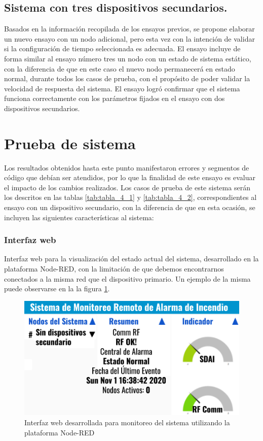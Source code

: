 \subsection{Sistema con tres dispositivos secundarios.}

Basados en la información recopilada de los ensayos previos, se propone elaborar un nuevo ensayo con un nodo adicional, pero esta vez con la intención de validar si la configuración de tiempo seleccionada es adecuada. El ensayo incluye de forma similar al ensayo número tres un nodo con un estado de sistema estático, con la diferencia de que en este caso el nuevo nodo permanecerá en estado normal, durante todos los casos de prueba, con el propósito de poder validar la velocidad de respuesta del sistema. El ensayo logró confirmar que el sistema funciona correctamente con los parámetros fijados en el ensayo con dos dispositivos secundarios.



\section{Prueba de sistema}


Los resultados obtenidos hasta este punto manifestaron errores y segmentos de código que debían ser atendidos, por lo que la finalidad de este ensayo es evaluar el impacto de los cambios realizados. Los casos de prueba de este sistema serán los descritos en las tablas \ref{tab:tabla_4_1} y \ref{tab:tabla_4_2}, correspondientes al ensayo con un dispositivo secundario, con la diferencia de que en esta ocasión, se incluyen las siguientes características al sistema: 

\subsubsection{Interfaz web}
Interfaz web para la visualización del estado actual del sistema, desarrollado en la plataforma Node-RED, con la limitación de que debemos encontrarnos conectados a la misma red que el dispositivo primario. Un ejemplo de la misma puede observarse en la la figura \ref{fig:figura_m}.


\begin{figure}[ht]
	\centering
	\includegraphics[scale=.55]{./Figures/Capitulo4/Figura_M.png}
	\caption{Interfaz web desarrollada para monitoreo del sistema utilizando la plataforma Node-RED}
	\label{fig:figura_m}
\end{figure}

